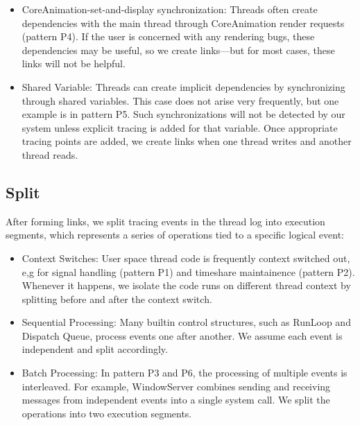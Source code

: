 \begin{itemize}
        \item CoreAnimation-set-and-display synchronization: Threads often
        create dependencies with the main thread through CoreAnimation render
        requests (pattern P4). If the user is concerned with any rendering
        bugs, these dependencies may be useful, so we create links---but for
        most cases, these links will not be helpful.

        \item Shared Variable: Threads can create implicit dependencies by
        synchronizing through shared variables. This case does not arise very
        frequently, but one example is in pattern P5. Such synchronizations
        will not be detected by our system unless explicit tracing is added for
        that variable. Once appropriate tracing points are added, we create
        links when one thread writes and another thread reads.

\end{itemize}

\subsection{Split}                                                                                                       
After forming links, we split tracing events in the thread log into execution
segments, which represents a series of operations tied to a specific logical
event:

\begin{itemize}
        \item Context Switches: User space thread code is frequently context
switched out, e,g for signal handling (pattern P1) and timeshare maintainence
(pattern P2). Whenever it happens, we isolate the code runs on different thread
context by splitting before and after the context switch.
        \item Sequential Processing: Many builtin control structures, such as
RunLoop and Dispatch Queue, process events one after another. We assume each
event is independent and split accordingly.
        \item Batch Processing: In pattern P3 and P6, the processing of
multiple events is interleaved. For example, WindowServer combines sending and
receiving messages from independent events into a single system call. We split
the operations into two execution segments. 

\end{itemize}

